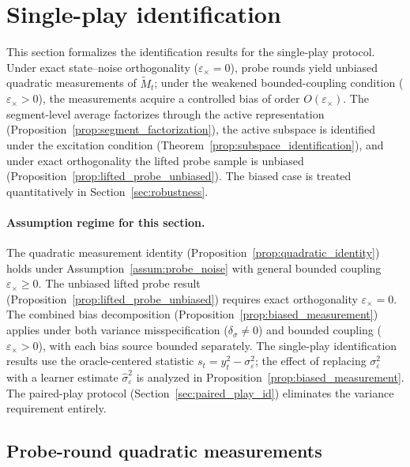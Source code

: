 \documentclass[12pt]{article}
\theoremstyle{plain}
\theoremstyle{definition}
\begin{document}
\section{Single-play identification}
\label{sec:single_play_id}

This section formalizes the identification results for the single-play protocol. Under exact state--noise orthogonality ($\varepsilon_\times = 0$), probe rounds yield unbiased quadratic measurements of $\widetilde{M}_t$; under the weakened bounded-coupling condition ($\varepsilon_\times > 0$), the measurements acquire a controlled bias of order $O(\varepsilon_\times)$. The segment-level average factorizes through the active representation (Proposition~\ref{prop:segment_factorization}), the active subspace is identified under the excitation condition (Theorem~\ref{prop:subspace_identification}), and under exact orthogonality the lifted probe sample is unbiased (Proposition~\ref{prop:lifted_probe_unbiased}). The biased case is treated quantitatively in Section~\ref{sec:robustness}.

\paragraph{Assumption regime for this section.}
The quadratic measurement identity (Proposition~\ref{prop:quadratic_identity}) holds under Assumption~\ref{assum:probe_noise} with general bounded coupling $\varepsilon_\times \ge 0$. The unbiased lifted probe result (Proposition~\ref{prop:lifted_probe_unbiased}) requires exact orthogonality $\varepsilon_\times = 0$. The combined bias decomposition (Proposition~\ref{prop:biased_measurement}) applies under both variance misspecification ($\delta_\sigma \neq 0$) and bounded coupling ($\varepsilon_\times > 0$), with each bias source bounded separately. The single-play identification results use the oracle-centered statistic $s_t = y_t^2 - \sigma_\varepsilon^2$; the effect of replacing $\sigma_\varepsilon^2$ with a learner estimate $\hat\sigma_\varepsilon^2$ is analyzed in Proposition~\ref{prop:biased_measurement}. The paired-play protocol (Section~\ref{sec:paired_play_id}) eliminates the variance requirement entirely.

\subsection{Probe-round quadratic measurements}
\end{document}
